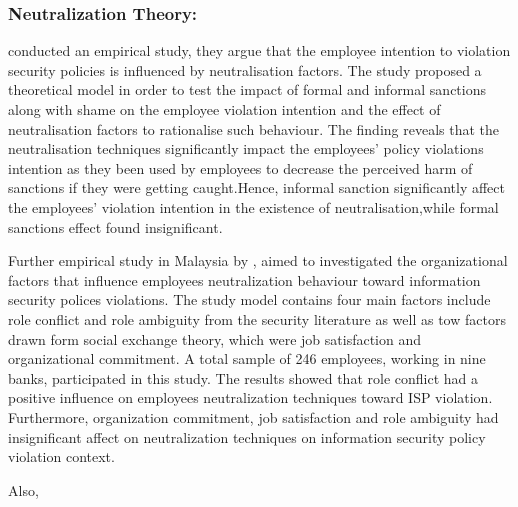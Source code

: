  \subsubsection{\textbf{Neutralization Theory:}}
 
 \citet{Siponen2010}conducted an empirical study, they argue that the employee intention to violation security policies is influenced by neutralisation factors. The study proposed a theoretical model in order to test the impact of formal and informal sanctions along with shame on the employee violation intention and the effect of neutralisation factors to rationalise such behaviour. The finding reveals that the neutralisation techniques significantly impact the employees' policy violations intention as they been used by employees to decrease the perceived harm of sanctions if they were getting caught.Hence, informal sanction significantly affect the employees' violation intention in the existence of neutralisation,while formal sanctions effect found insignificant.  

Further empirical study in Malaysia by \citet{Teh2015}, aimed to investigated the organizational factors that influence employees neutralization behaviour toward information security polices violations. The study model contains four main  factors include role conflict and role ambiguity from the security literature as well as tow factors drawn form social exchange theory, which were job satisfaction and organizational commitment. A total sample of 246 employees, working in nine banks, participated in this study. The results showed that role conflict had a positive influence on employees neutralization techniques toward ISP violation. Furthermore, organization commitment, job satisfaction and role ambiguity had insignificant affect on neutralization techniques on information security policy violation context. 

Also, 


  